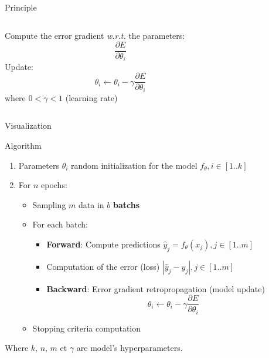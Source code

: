 
\begin{frame}{Principle}
  \begin{columns}
    \begin{column}{0.5\textwidth}
      Compute the error gradient \emph{w.r.t.} the parameters:
      \[
      \frac{\partial{E}}{\partial{\theta_i}}
      \]
      Update:
      \[
        \theta_i \leftarrow \theta_i - \gamma\frac{\partial{E}}{\partial{\theta_i}}
      \]
      where $0 < \gamma < 1$ (learning rate)
    \end{column}
    \begin{column}{0.5\textwidth}
    \end{column}
  \end{columns}
\end{frame}

\begin{frame}{Visualization}
\end{frame}

\begin{frame}{Algorithm}
  \begin{enumerate}[<+->]
    \item Parameters $\theta_i$ random initialization for the model $f_{\theta}, i\in[1..k]$
    \item For $n$ epochs:
      \begin{itemize}
        \item Sampling $m$ data in $b$ \textbf{batchs}
        \item For each batch:
        \begin{itemize}
          \item \textbf{Forward}: Compute predictions $\hat{y}_j = f_{\theta}(x_j), j\in[1..m]$
          \item Computation of the error (loss) $|\hat{y}_j-y_j|, j\in[1..m]$
          \item \textbf{Backward}: Error gradient retropropagation (model update)
          \[
            \theta_i \leftarrow \theta_i - \gamma\frac{\partial{E}}{\partial{\theta_i}}
          \]
        \end{itemize}
      \item Stopping criteria computation
      \end{itemize}
  \end{enumerate}

  Where $k$, $n$, $m$ et $\gamma$ are model's hyperparameters.
\end{frame}


